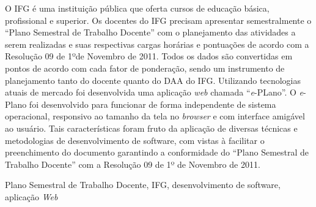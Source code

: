 O \acf{IFG} é uma instituição pública que oferta cursos de educação básica, profissional e superior. 
Os docentes do \ac{IFG} precisam apresentar semestralmente o ``Plano Semestral de Trabalho Docente'' com o planejamento das atividades a serem realizadas e suas respectivas cargas horárias e pontuações de acordo com a Resolução 09 de 1ºde Novembro de 2011.
Todos os dados são convertidas em pontos de acordo com cada fator de ponderação, sendo um instrumento de planejamento tanto do docente quanto do \acf{DAA} do \ac{IFG}. 
Utilizando tecnologias atuais de mercado foi desenvolvida uma aplicação \textit{web} chamada ``\textit{e}-PLano''.
O \textit{e}-Plano foi desenvolvido para funcionar de forma independente de sistema operacional, responsivo ao tamanho da tela no \textit{browser} e com interface amigável ao usuário.
Tais características foram fruto da aplicação de diversas técnicas e metodologias de desenvolvimento de software, com vistas à facilitar o preenchimento do documento garantindo a conformidade do ``Plano Semestral de Trabalho Docente'' com a Resolução 09 de 1º de Novembro de 2011.

\begin{keywords}
Plano Semestral de Trabalho Docente, IFG, desenvolvimento de software, aplicação \textit{Web} 
\end{keywords}